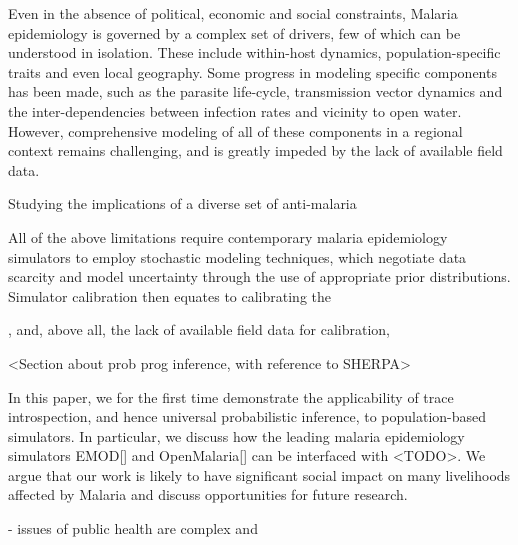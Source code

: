 \documentclass{article}
\begin{document}
Even in the absence of political, economic and social constraints, Malaria epidemiology is governed by a complex set of drivers, few of which can be understood in isolation. These include within-host dynamics, population-specific traits and even local geography. Some progress in modeling specific components has been made, such as the parasite life-cycle, transmission vector dynamics and the inter-dependencies between infection rates and vicinity to open water. However, comprehensive modeling of all of these components in a regional context remains challenging, and is greatly impeded by the lack of available field data.

Studying the implications of a diverse set of anti-malaria 

All of the above limitations require contemporary malaria epidemiology simulators to employ stochastic modeling techniques, which negotiate data scarcity and model uncertainty through the use of appropriate prior distributions. Simulator calibration then equates to calibrating the 

, and, above all, the lack of available field data for calibration, 


<Section about prob prog inference, with reference to SHERPA>

In this paper, we for the first time demonstrate the applicability of trace introspection, and hence universal probabilistic inference, to population-based simulators. In particular, we discuss how the leading malaria epidemiology simulators EMOD[] and OpenMalaria[] can be interfaced with <TODO>. We argue that our work is likely to have significant social impact on many livelihoods affected by Malaria and discuss opportunities for future research.



- issues of public health are complex and 
\end{document}
